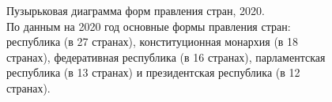 \begin{figure}
	{
		\setlength{\fboxsep}{0pt}%
		\setlength{\fboxrule}{1pt}%
	}
	\caption{Пузырьковая диаграмма форм правления стран, 2020.
	\\
	По данным на 2020 год  основные формы правления стран: республика (в 27 странах), конституционная монархия (в 18 странах), федеративная республика (в 16 странах), парламентская республика (в 13 странах) и президентская республика (в 12 странах).
}%
	\label{fig:bubble_chart_forms_of_government_countries_2020}%
\end{figure}